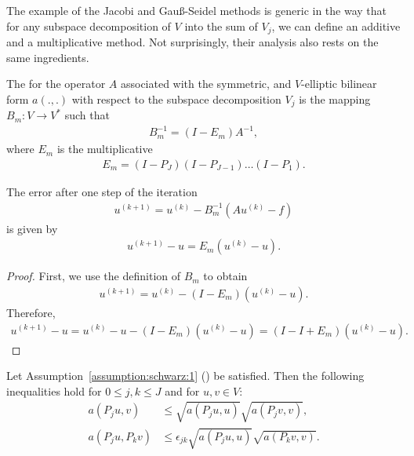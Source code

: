 \begin{intro}
  The example of the Jacobi and Gauß-Seidel methods is generic in the
  way that for any subspace decomposition of $V$ into the sum of
  $V_j$, we can define an additive and a multiplicative method. Not
  surprisingly, their analysis also rests on the same ingredients.
\end{intro}

\begin{definition}
  The  for the operator $A$ associated
  with the symmetric, and $V$-elliptic bilinear form $a(.,.)$ with
  respect to the subspace decomposition $V_j$ is the mapping $B_m:
  V \to V^*$ such that
  \begin{gather}
    \label{eq:schwarz:34}
    B_m^{-1} = (I -  E_m) A^{-1},
  \end{gather}
  where $E_m$ is the multiplicative 
  \begin{gather}
    \label{eq:schwarz:35}
    E_m = (I - P_J)(I - P_{J-1})\dots(I - P_1).
  \end{gather}
\end{definition}

\begin{lemma}
  The error after one step of the iteration
  \begin{gather*}
    u^{(k+1)} = u^{(k)} - B_m^{-1}\left(A u^{(k)} - f\right)
  \end{gather*}
  is given by
  \begin{gather*}
    u^{(k+1)} - u = E_m \left(u^{(k)} - u\right).
  \end{gather*}
\end{lemma}

\begin{proof}
  First, we use the definition of $B_m$ to obtain
  \begin{gather*}
    u^{(k+1)} = u^{(k)} - (I -  E_m) \left(u^{(k)} - u\right).
  \end{gather*}
  Therefore,
  \begin{gather*}
    u^{(k+1)} - u = u^{(k)} - u - (I -  E_m) \left(u^{(k)} - u\right)
    = (I-I+E_m) \left(u^{(k)} - u\right).
  \end{gather*}  
\end{proof}

\begin{lemma}
  Let Assumption~\ref{assumption:schwarz:1} () be satisfied. Then the following
  inequalities hold for $0\le j,k \le J$ and for $u,v\in V$:
  \begin{align}
    a(P_j u,v) &\le \sqrt{a(P_j u,u)} \sqrt{a(P_j v,v)}, \\
    a(P_j u,P_k v) &\le \epsilon_{jk}
    \sqrt{a(P_j u,u)} \sqrt{a(P_k v,v)}.
  \end{align}
\end{lemma}

